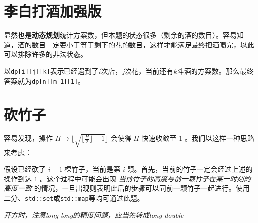 \documentclass[12pt, a4paper, UTF8]{ctexart}
\newcommand{\cppinput}[1]{
  
}
\begin{document}
\section{李白打酒加强版}

显然也是\textbf{动态规划}统计方案数，但本题的状态很多（剩余的酒的数目）。容易知道，酒的数目一定要小于等于剩下的花的数目，这样才能满足最终把酒喝完，以此可以排除许多的非法状态。

以\texttt{dp[i][j][k]}表示已经遇到了$i$次店，$j$次花，当前还有$k$斗酒的方案数。那么最终答案就为\texttt{dp[n][m-1][1]}。
\cppinput{I.cpp}

\section{砍竹子}
容易发现，操作 $H \rightarrow \lfloor\sqrt{\lfloor\frac{H}{2}\rfloor+1}\rfloor$ 会使得 $H$ 快速收敛至 $1$ 。我们以这样一种思路来考虑：

假设已经砍了 $i-1$ 棵竹子，当前是第 $i$ 颗。首先，当前的竹子一定会经过上述的操作到达 $1$ 。这个过程中可能会出现 \emph{当前竹子的高度与前一颗竹子在某一时刻的高度一致} 的情况，一旦出现则表明此后的步骤可以同前一颗竹子一起进行。使用二分、\texttt{std::set}或\texttt{std::map}等均可通过此题。

\textit{开方时，注意long long的精度问题，应当先转成long double}
\cppinput{J.cpp}
\end{document}
